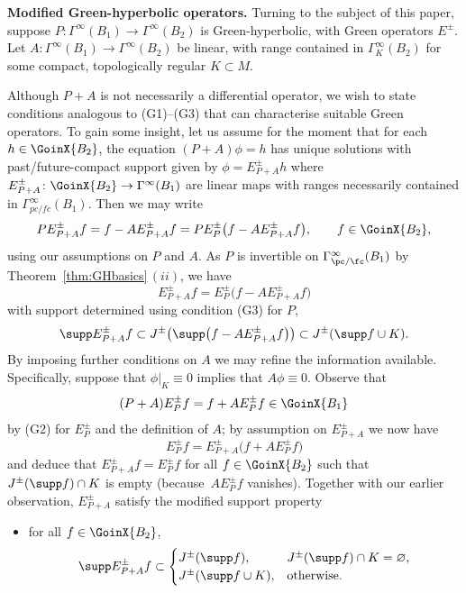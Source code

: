  {\bf Modified Green-hyperbolic operators.}
 Turning to the subject of this paper, suppose $P\colon \Gamma^\infty(B_1)\to \Gamma^\infty(B_2)$ is Green-hyperbolic, with Green operators $E^\pm$. Let $A\colon\Gamma^\infty(B_1)\to \Gamma^\infty(B_2)$ be linear, with range contained in $\Gamma^\infty_K(B_2)$ for some compact, topologically regular $K\subset M$.

 Although $P+A$ is not necessarily a differential operator, we wish to state conditions analogous to (G1)--(G3) that can characterise suitable Green operators.
 To gain some insight, let us assume for the moment that
 for each $h\in \GoinX{B_2}$, the equation $(P+A)\phi=h$ has unique solutions with past/future-compact support given by $\phi=E_{P+A}^\pm h$ where $E_{P+A}^{\pm}\colon \GoinX{B_2}\to \Gamma^\infty(B_1)$ are linear maps with ranges
 necessarily contained in $\Gamma^\infty_{pc/fc}(B_1)$. Then we may write
 \begin{equation*}
 	PE_{P+A}^\pm f = f- AE_{P+A}^\pm f = PE_P^\pm\big(f- AE_{P+A}^\pm f\big),\qquad f\in \GoinX{B_2},
 \end{equation*}
 using our assumptions on $P$ and $A$. As $P$ is invertible on $\Gamma^\infty_{\pc/\fc}(B_1)$ by Theorem~\ref{thm:GHbasics}\,$(ii)$, we have
 \begin{equation*}
 	E_{P+A}^\pm f = E_P^\pm \big(f-AE_{P+A}^\pm f\big)
 \end{equation*}
 with support determined using condition (G3) for $P$,
 \begin{equation*}
 	\supp E_{P+A}^\pm f \subset J^\pm \big(\supp \big(f-AE_{P+A}^\pm f\big)\big) \subset J^\pm(\supp f\cup K).
 \end{equation*}
 By imposing further conditions on $A$ we may refine the information available. Specifically, suppose that $\phi|_K\equiv 0$ implies that $A\phi\equiv 0$.
 Observe that
 \begin{equation*}
 	(P+A)E_P^\pm f = f+ AE_P^\pm f \in \GoinX{B_1}
 \end{equation*}
 by (G2) for $E_P^\pm$ and the definition of $A$; by assumption on $E^\pm_{P+A}$ we now have
 \begin{equation*}
 	E_P^\pm f = E_{P+A}^\pm \big(f+ AE_P^\pm f\big)
 \end{equation*}
 and deduce that $E_{P+A}^\pm f=E_P^\pm f$ for all $f\in \GoinX{B_2}$ such that
 $J^\pm(\supp f)\cap K$ is empty \big(because~$AE_P^\pm f$ vanishes\big). Together with our earlier observation, $E^\pm_{P+A}$ satisfy the modified support property
 \begin{itemize}\setlength{\leftskip}{0.10cm}
\item[(G3${}'$)] for all $f\in \GoinX{B_2}$,
 	\begin{equation*}\displaystyle \supp E_{P+A}^{\pm} f \subset
 		\begin{cases} J^{\pm}(\supp f), & J^\pm(\supp f)\cap K=\varnothing,\\
 			J^{\pm}(\supp f\cup K), & \text{otherwise.}
 	\end{cases}\end{equation*}
 \end{itemize}
